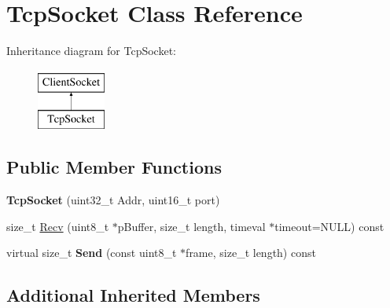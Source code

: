 \hypertarget{class_tcp_socket}{\section{Tcp\-Socket Class Reference}
\label{class_tcp_socket}
}
Inheritance diagram for Tcp\-Socket\-:\begin{figure}[H]
\begin{center}
\leavevmode
\includegraphics[height=2.000000cm]{class_tcp_socket}
\end{center}
\end{figure}
\subsection*{Public Member Functions}
\begin{DoxyCompactItemize}
\item 
\hypertarget{class_tcp_socket_ac7d0bc1afd5de6ed718785d35c656bb3}{{\bfseries Tcp\-Socket} (uint32\-\_\-t Addr, uint16\-\_\-t port)}\label{class_tcp_socket_ac7d0bc1afd5de6ed718785d35c656bb3}

\item 
size\-\_\-t \hyperlink{class_tcp_socket_ae11e390e4c9f9de484da2868a25d1623}{Recv} (uint8\-\_\-t $\ast$p\-Buffer, size\-\_\-t length, timeval $\ast$timeout=N\-U\-L\-L) const 
\item 
\hypertarget{class_tcp_socket_aadee07197b48fb7f50f7e9069fdb8d2d}{virtual size\-\_\-t {\bfseries Send} (const uint8\-\_\-t $\ast$frame, size\-\_\-t length) const }\label{class_tcp_socket_aadee07197b48fb7f50f7e9069fdb8d2d}

\end{DoxyCompactItemize}
\subsection*{Additional Inherited Members}


